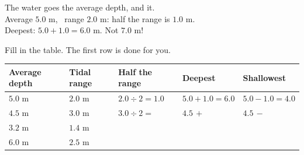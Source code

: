 \documentclass[12pt,a4paper]{article}
\newif\iffr
\newcommand{\fr}[1]{\unskip\iffr\par\nobreak\vspace{1pt}\noindent{\small\itshape\color{black!60}#1}\par\fi}
\newcommand{\tall}{\rule[-0.6em]{0pt}{1.9em}}
\renewcommand{\tall}{\rule[-0.8em]{0pt}{2.4em}}
\begin{document}
\begin{remember}
  \noindent\begin{minipage}[c]{0.66\linewidth}
  The water goes  the average depth, and  it. \\[3pt]
  Average $5.0$ m, \, range $2.0$ m: \; half the range is $1.0$ m. \\
  Deepest: $5.0 + 1.0 = \mathbf{6.0}$ m. \; Not $7.0$ m!
  \fr{L'eau monte de la moiti\'e du marnage au-dessus de la profondeur moyenne
  (\eng{average depth}), et descend de la moiti\'e en dessous. Le plus profond~: 6.0
  m, pas 7.0 m~!}
  \end{minipage}\hfill
  \begin{minipage}[c]{0.30\linewidth}\centering
  \end{minipage}
\end{remember}

\noindent\begin{minipage}{\textwidth}
Fill in the table. The first row is done for you.
\fr{Compl\`ete le tableau. La premi\`ere ligne est faite pour toi.}

\vspace{4pt}
{\setlength{\tabcolsep}{4pt}%
\noindent
\begin{tabularx}{\textwidth}{|C{1.9cm}|C{1.9cm}|L|L|L|}
  \hline
  \textbf{Average depth} & \textbf{Tidal range} & \textbf{Half the range}
  & \textbf{Deepest} 
  & \textbf{Shallowest}  \\
  \hline
  $5.0$ m \tall & $2.0$ m & $2.0 \div 2 = 1.0$ & $5.0 + 1.0 = 6.0$ &
    $5.0 - 1.0 = 4.0$ \\ \hline
  $4.5$ m \tall & $3.0$ m & $3.0 \div 2 =$ & $4.5 \,+$ & $4.5 \,-$ \\ \hline
  $3.2$ m \tall & $1.4$ m & & & \\ \hline
  $6.0$ m \tall & $2.5$ m & & & \\ \hline
\end{tabularx}}
\end{minipage}
\end{document}
